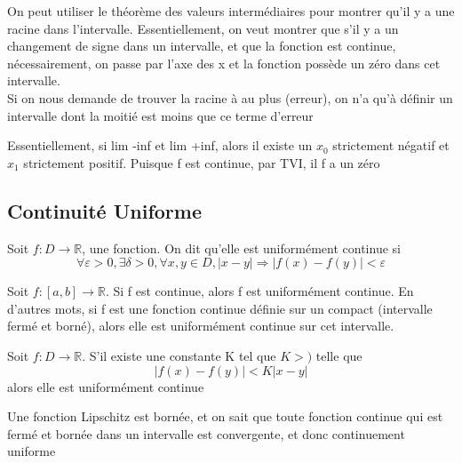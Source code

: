 \documentclass{article}
\begin{document}
\begin{problem}
    On peut utiliser le théorème des valeurs intermédiaires pour montrer
    qu'il y a une racine dans l'intervalle. Essentiellement, on veut
    montrer que s'il y a un changement de signe dans un intervalle, et
    que la fonction est continue, nécessairement, on passe par l'axe
    des x et la fonction possède un zéro dans cet intervalle.\\
    Si on nous demande de trouver la racine à au plus (erreur), on n'a
    qu'à définir un intervalle dont la moitié est moins que ce terme
    d'erreur
\end{problem}

\begin{problem}[Montrer que si f est continue est $\lim_{n \to -\infty}
    a_n = -\infty$ et $\lim_{n \to \infty} \infty$, alors f possède au
    moins un zéro]
    Essentiellement, si lim -inf et lim +inf, alors il existe un $x_0$
    strictement négatif et $x_1$ strictement positif. Puisque f est
    continue, par TVI, il f a un zéro
\end{problem}

\subsection{Continuité Uniforme}

\begin{definition}
    Soit $f:D \to \mathbb{R}$, une fonction. On dit qu'elle est
    uniformément continue si $$\forall \varepsilon > 0, \exists \delta >0,
    \forall x,y \in D, |x-y| \Longrightarrow |f(x) - f(y)|< \varepsilon$$
\end{definition}

\begin{theorem}
    Soit $f:[a,b] \to \mathbb{R}$. Si f est continue, alors f est
    uniformément continue. En d'autres mots, si f est une fonction
    continue définie sur un compact (intervalle fermé et borné), alors
    elle est uniformément continue sur cet intervalle.
\end{theorem}

\begin{theorem}
    Soit $f:D \to \mathbb{R}$. S'il existe une constante K tel que
    $K >)$ telle que $$ |f(x) - f(y)| < K |x-y|$$ alors elle est
    uniformément continue
\end{theorem}

\begin{remark}
    Une fonction Lipschitz est bornée, et on sait que toute fonction
    continue qui est fermé et bornée dans un intervalle est convergente,
    et donc continuement uniforme
\end{remark}
\end{document}
